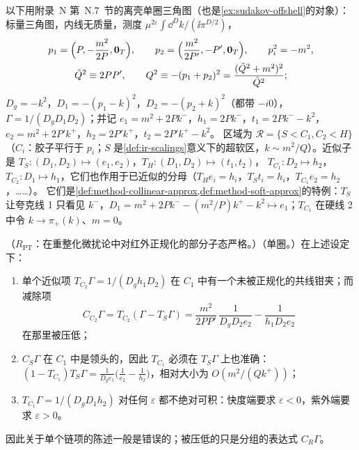 以下用附录~N 第~N.7~节的离壳单圈三角图（也是\cref{ex:sudakov-offshell}的对象）：标量三角图，内线无质量，测度 $\mu^{2\varepsilon}\int\dd^Dk/(\ii\pi^{D/2})$，
\begin{equation}\label{eq:method-tri-kin}
\begin{gathered}
p_1=\Bigl(P,-\frac{m^2}{2P},\mathbf 0_T\Bigr),\qquad p_2=\Bigl(\frac{m^2}{2P'},-P',\mathbf 0_T\Bigr),\qquad p_i^2=-m^2,\\
\tilde Q^2\equiv2PP',\qquad Q^2\equiv-(p_1+p_2)^2=\frac{(\tilde Q^2+m^2)^2}{\tilde Q^2} ;
\end{gathered}
\end{equation}
$D_g=-k^2$，$D_1=-(p_1-k)^2$，$D_2=-(p_2+k)^2$（都带 $-i0$），$\Gamma=1/(D_gD_1D_2)$；并记 $e_1=m^2+2Pk^-$，$h_1=2Pk^-$，$t_1=2Pk^--k^2$，$e_2=m^2+2P'k^+$，$h_2=2P'k^+$，$t_2=2P'k^+-k^2$。
区域为 $\mathcal R=\{S<C_1,C_2<H\}$（$C_i$：胶子平行于 $p_i$；$S$ 是\cref{def:ir-scalings}意义下的超软区，$k\sim m^2/Q$）。近似子是 $T_S:(D_1,D_2)\mapsto(e_1,e_2)$，$T_H:(D_1,D_2)\mapsto(t_1,t_2)$，
$T_{C_1}:D_2\mapsto h_2$，$T_{C_2}:D_1\mapsto h_1$，它们也作用于已近似的分母（$T_He_i=h_i$，$T_St_i=h_i$，$T_{C_1}e_2=h_2$，……）。
它们是\cref{def:method-collinear-approx,def:method-soft-approx}的特例：$T_S$ 让夸克线 1 只看见 $k^-$，$D_1=m^2+2Pk^--(m^2/P)k^+-k^2\mapsto e_1$；$T_{C_1}$ 在硬线 2 中令 $k\to\pi_+(k)$、$m=0$。

\begin{example}\label{ex:method-naive-induction}
（$R_{\mathrm{PT}}$：在重整化微扰论中对红外正规化的部分子态严格。）（单圈。）在上述设定下：
\begin{enumerate}[label=(\alph*),leftmargin=2em,itemsep=1pt,topsep=2pt]
\item 单个近似项 $T_{C_2}\Gamma=1/(D_gh_1D_2)$ 在 $C_1$ 中有一个未被正规化的共线钳夹；而减除项
  \begin{equation}\label{eq:method-CC2}
  C_{C_2}\Gamma=T_{C_2}(\Gamma-T_S\Gamma)=\frac{m^2}{2PP'}\,\frac1{D_gD_2e_2}-\frac1{h_1D_2e_2}
  \end{equation}
  在那里被压低；
\item $C_S\Gamma$ 在 $C_1$ 中是领头的，因此 $T_{C_1}$ 必须在 $T_S\Gamma$ 上也准确：$(1-T_{C_1})T_S\Gamma=\frac1{D_ge_1}\bigl(\frac1{e_2}-\frac1{h_2}\bigr)$，相对大小为 $O(m^2/(Qk^+))$；
\item $T_{C_1}\Gamma=1/(D_gD_1h_2)$ 对任何 $\varepsilon$ 都不绝对可积：快度端要求 $\varepsilon<0$，紫外端要求 $\varepsilon>0$。
\end{enumerate}
因此关于单个链项的陈述一般是错误的；被压低的只是分组的表达式 $C_R\Gamma$。
\end{example}

